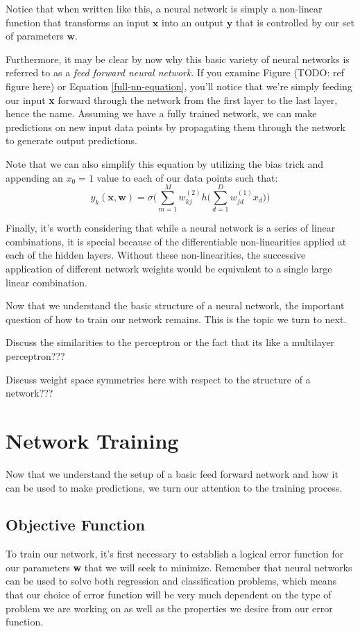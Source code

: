 Notice that when written like this, a neural network is simply a non-linear function that transforms an input $\textbf{x}$ into an output $\textbf{y}$ that is controlled by our set of parameters $\textbf{w}$.

Furthermore, it may be clear by now why this basic variety of neural networks is referred to as a \textit{feed forward neural network}. If you examine Figure (TODO: ref figure here) or Equation \ref{full-nn-equation}, you'll notice that we're simply feeding our input \textbf{x} forward through the network from the first layer to the last layer, hence the name. Assuming we have a fully trained network, we can make predictions on new input data points by propagating them through the network to generate output predictions.

Note that we can also simplify this equation by utilizing the bias trick and appending an $x_{0}=1$ value to each of our data points such that:
\begin{equation*}
	y_{k}(\textbf{x}, \textbf{w}) = \sigma\bigg(\sum_{m=1}^{M}w_{kj}^{(2)} h\bigg(\sum_{d=1}^{D}w_{jd}^{(1)}x_{d}\bigg)\bigg)
\end{equation*}

Finally, it's worth considering that while a neural network is a series of linear combinations, it is special because of the differentiable non-linearities applied at each of the hidden layers. Without these non-linearities, the successive application of different network weights would be equivalent to a single large linear combination.

Now that we understand the basic structure of a neural network, the important question of how to train our network remains. This is the topic we turn to next.

Discuss the similarities to the perceptron or the fact that its like a multilayer perceptron???

Discuss weight space symmetries here with respect to the structure of a network???

\section{Network Training}
Now that we understand the setup of a basic feed forward network and how it can be used to make predictions, we turn our attention to the training process.

\subsection{Objective Function}
To train our network, it's first necessary to establish a logical error function for our parameters \textbf{w} that we will seek to minimize. Remember that neural networks can be used to solve both regression and classification problems, which means that our choice of error function will be very much dependent on the type of problem we are working on as well as the properties we desire from our error function.

